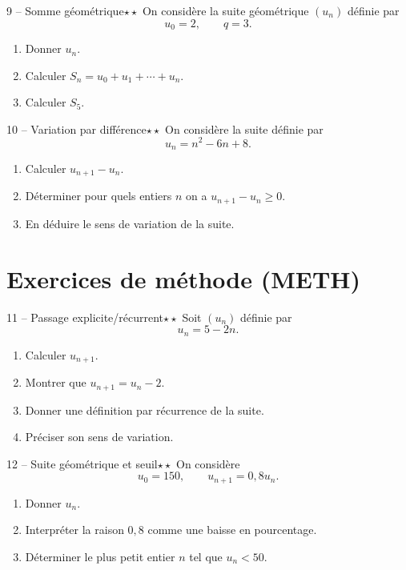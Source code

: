 \documentclass[11pt,a4paper]{article}
\newcommand{\deuxetoiles}{\(\star\star\)}
\begin{document}
\begin{exobox}{9 -- Somme géométrique}{\deuxetoiles}
On considère la suite géométrique \((u_n)\) définie par
\[
u_0=2,\qquad q=3.
\]
\begin{enumerate}[label=\alph*)]
  \item Donner \(u_n\).
  \item Calculer \(S_n=u_0+u_1+\cdots+u_n\).
  \item Calculer \(S_5\).
\end{enumerate}
\end{exobox}

\begin{exobox}{10 -- Variation par différence}{\deuxetoiles}
On considère la suite définie par
\[
u_n=n^2-6n+8.
\]
\begin{enumerate}[label=\alph*)]
  \item Calculer \(u_{n+1}-u_n\).
  \item Déterminer pour quels entiers \(n\) on a \(u_{n+1}-u_n\geq 0\).
  \item En déduire le sens de variation de la suite.
\end{enumerate}
\end{exobox}

\section{Exercices de méthode (METH)}

\begin{exobox}{11 -- Passage explicite/récurrent}{\deuxetoiles}
Soit \((u_n)\) définie par
\[
u_n=5-2n.
\]
\begin{enumerate}[label=\alph*)]
  \item Calculer \(u_{n+1}\).
  \item Montrer que \(u_{n+1}=u_n-2\).
  \item Donner une définition par récurrence de la suite.
  \item Préciser son sens de variation.
\end{enumerate}
\end{exobox}

\begin{exobox}{12 -- Suite géométrique et seuil}{\deuxetoiles}
On considère
\[
u_0=150,\qquad u_{n+1}=0{,}8u_n.
\]
\begin{enumerate}[label=\alph*)]
  \item Donner \(u_n\).
  \item Interpréter la raison \(0{,}8\) comme une baisse en pourcentage.
  \item Déterminer le plus petit entier \(n\) tel que \(u_n<50\).
\end{enumerate}
\end{exobox}
\end{document}
